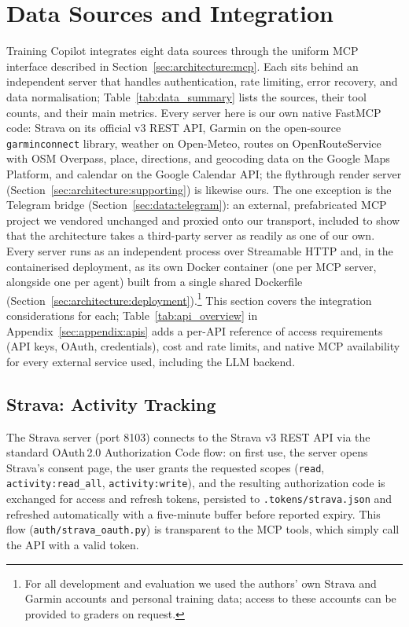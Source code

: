 \section{Data Sources and Integration}\label{sec:data}

Training Copilot integrates eight data sources through the uniform MCP interface described in Section~\ref{sec:architecture:mcp}. Each sits behind an independent server that handles authentication, rate limiting, error recovery, and data normalisation; Table~\ref{tab:data_summary} lists the sources, their tool counts, and their main metrics. Every server here is our own native FastMCP code: Strava on its official v3 REST API, Garmin on the open-source \texttt{garminconnect} library, weather on Open-Meteo, routes on OpenRouteService with OSM Overpass, place, directions, and geocoding data on the Google Maps Platform, and calendar on the Google Calendar API; the flythrough render server (Section~\ref{sec:architecture:supporting}) is likewise ours. The one exception is the Telegram bridge (Section~\ref{sec:data:telegram}): an external, prefabricated MCP project we vendored unchanged and proxied onto our transport, included to show that the architecture takes a third-party server as readily as one of our own. Every server runs as an independent process over Streamable HTTP and, in the containerised deployment, as its own Docker container (one per MCP server, alongside one per agent) built from a single shared Dockerfile (Section~\ref{sec:architecture:deployment}).\footnote{For all development and evaluation we used the authors' own Strava and Garmin accounts and personal training data; access to these accounts can be provided to graders on request.} This section covers the integration considerations for each; Table~\ref{tab:api_overview} in Appendix~\ref{sec:appendix:apis} adds a per-API reference of access requirements (API keys, OAuth, credentials), cost and rate limits, and native MCP availability for every external service used, including the LLM backend.

\subsection{Strava: Activity Tracking}\label{sec:data:strava}

The Strava server (port 8103) connects to the Strava v3 REST API via the standard OAuth\,2.0 Authorization Code flow: on first use, the server opens Strava's consent page, the user grants the requested scopes (\texttt{read}, \texttt{activity:read\_all}, \texttt{activity:write}), and the resulting authorization code is exchanged for access and refresh tokens, persisted to \texttt{.tokens/strava.json} and refreshed automatically with a five-minute buffer before reported expiry. This flow (\texttt{auth/strava\_oauth.py}) is transparent to the MCP tools, which simply call the API with a valid token.


